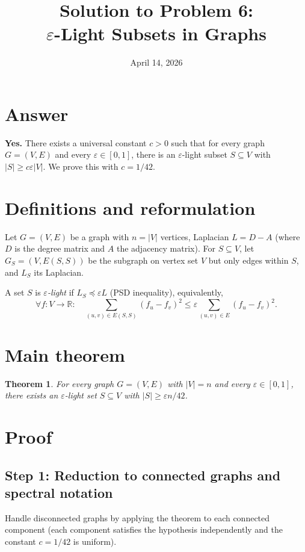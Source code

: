 \documentclass[12pt]{article}
\title{Solution to Problem 6:\\$\varepsilon$-Light Subsets in Graphs}
\author{}
\date{April 14, 2026}
\newtheorem{theorem}{Theorem}
\begin{document}
\maketitle

\section*{Answer}

\textbf{Yes.} There exists a universal constant $c > 0$ such that for every graph $G=(V,E)$ and every $\varepsilon \in [0,1]$, there is an $\varepsilon$-light subset $S\subseteq V$ with $|S| \geq c\varepsilon|V|$.  We prove this with $c = 1/42$.

\section*{Definitions and reformulation}

Let $G=(V,E)$ be a graph with $n=|V|$ vertices, Laplacian $L = D - A$ (where $D$ is the degree matrix and $A$ the adjacency matrix).  For $S \subseteq V$, let $G_S = (V, E(S,S))$ be the subgraph on vertex set $V$ but only edges within $S$, and $L_S$ its Laplacian.

A set $S$ is \emph{$\varepsilon$-light} if $L_S \preceq \varepsilon L$ (PSD inequality), equivalently,
\[
  \forall f : V\to\mathbb{R}:\quad
  \sum_{(u,v)\in E(S,S)}(f_u-f_v)^2 \leq \varepsilon\sum_{(u,v)\in E}(f_u-f_v)^2.
\]

\section*{Main theorem}

\begin{theorem}
  \label{thm:main}
  For every graph $G=(V,E)$ with $|V|=n$ and every $\varepsilon\in[0,1]$, there exists an $\varepsilon$-light set $S\subseteq V$ with $|S| \geq \varepsilon n/42$.
\end{theorem}

\section*{Proof}

\subsection*{Step 1: Reduction to connected graphs and spectral notation}

Handle disconnected graphs by applying the theorem to each connected component (each component satisfies the hypothesis independently and the constant $c = 1/42$ is uniform).
\end{document}
